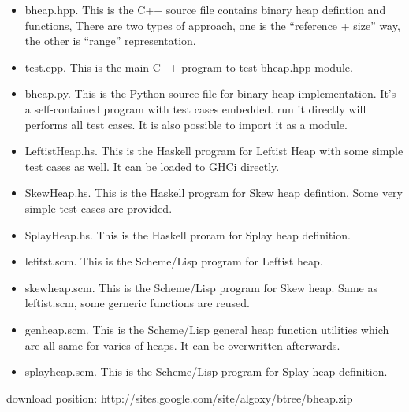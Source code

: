 \documentclass{article}
\begin{document}
\begin{itemize}
\item bheap.hpp. This is the C++ source file contains binary heap defintion and functions, There are two types of approach, one is the ``reference + size'' way, the other is ``range'' representation.

\item test.cpp. This is the main C++ program to test bheap.hpp module.

\item bheap.py. This is the Python source file for binary heap implementation. It's a self-contained program with test cases embedded. run it directly will performs all test cases. It is also possible to import it as a module.

\item LeftistHeap.hs. This is the Haskell program for Leftist Heap with some simple test cases as well. It can be loaded to GHCi directly.

\item SkewHeap.hs. This is the Haskell program for Skew heap defintion. Some very simple test cases are provided.

\item SplayHeap.hs. This is the Haskell proram for Splay heap definition.

\item lefitst.scm. This is the Scheme/Lisp program for Leftist heap. 

\item skewheap.scm. This is the Scheme/Lisp program for Skew heap. Same as leftist.scm, some gerneric functions are reused.

\item genheap.scm. This is the Scheme/Lisp general heap function utilities which are all same for varies of heaps. It can be overwritten afterwards.

\item splayheap.scm. This is the Scheme/Lisp program for Splay heap definition.
\end{itemize}

download position: http://sites.google.com/site/algoxy/btree/bheap.zip
\end{document}
